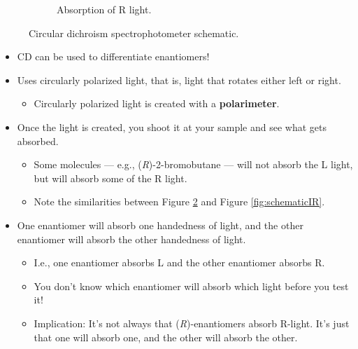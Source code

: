 \documentclass[../notes.tex]{subfiles}
\begin{document}
\begin{itemize}
\begin{figure}[h!]
\begin{subfigure}[b]{0.47\linewidth}
            \caption{Absorption of R light.}
            \label{fig:schematicCDb}
        \end{subfigure}
        \caption{Circular dichroism spectrophotometer schematic.}
        \label{fig:schematicCD}
    \end{figure}
    \begin{itemize}
        \item CD can be used to differentiate enantiomers!
        \item Uses circularly polarized light, that is, light that rotates either left or right.
        \begin{itemize}
            \item Circularly polarized light is created with a \textbf{polarimeter}.
        \end{itemize}
        \item Once the light is created, you shoot it at your sample and see what gets absorbed.
        \begin{itemize}
            \item Some molecules --- e.g., (\emph{R})-2-bromobutane --- will not absorb the L light, but will absorb some of the R light.
            \item Note the similarities between Figure \ref{fig:schematicCD} and Figure \ref{fig:schematicIR}.
        \end{itemize}
        \item One enantiomer will absorb one handedness of light, and the other enantiomer will absorb the other handedness of light.
        \begin{itemize}
            \item I.e., one enantiomer absorbs L and the other enantiomer absorbs R.
            \item You don't know which enantiomer will absorb which light before you test it!
            \item Implication: It's not always that (\emph{R})-enantiomers absorb R-light. It's just that one will absorb one, and the other will absorb the other.
        \end{itemize}

\end{itemize}
\end{itemize}
\end{document}
